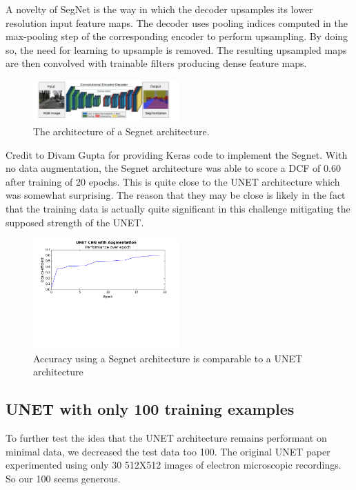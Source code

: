 \documentclass[letterpaper]{article}
\begin{document}
A novelty of SegNet  is the way in which the decoder upsamples its lower resolution input feature maps. The decoder uses pooling indices computed in the max-pooling step of the corresponding encoder to perform upsampling. By doing so, the need for learning to upsample is removed. The resulting upsampled maps are then convolved with trainable filters producing dense feature maps. 

 \begin{figure}[H]
  \centerline{\includegraphics[width=0.5\textwidth]{Images/SegNetArchitecture.png}}
  \caption{The architecture of a Segnet architecture.}
  \label{fig:segnet}
\end{figure}


Credit to Divam Gupta for providing Keras code to implement the Segnet. \cite{segnetimplementation}With no data augmentation, the Segnet architecture was able to score a DCF of 0.60 after training of 20 epochs. This is quite close to the UNET architecture which was somewhat surprising. The reason that they may be close is likely in the fact that the training data is actually quite significant in this challenge mitigating the supposed strength of the UNET.

 \begin{figure}[H]
  \centerline{\includegraphics[width=0.5\textwidth]{Plots/SegNet.png}}
  \caption{Accuracy using a Segnet architecture is comparable to a UNET architecture}
  \label{fig:trainingSegnet.}
\end{figure}

\subsection{UNET with only 100 training examples}
To further test the idea that the UNET architecture remains performant on minimal data, we decreased the test data too 100. The original UNET paper experimented using only 30 512X512 images of electron microscopic recordings. So our 100 seems generous. 
\end{document}
